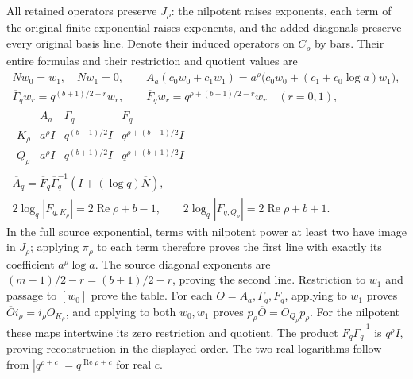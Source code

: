 All retained operators preserve \(J_\rho\): the nilpotent raises
exponents, each term of the original finite exponential raises
exponents, and the added diagonals preserve every original basis
line. Denote their induced operators on \(C_\rho\) by bars.
Their entire formulas and their restriction and quotient values are
\[
 \begin{gathered}
 \overline Nw_0=w_1,\quad\overline Nw_1=0,\qquad
 \overline A_a(c_0w_0+c_1w_1)
   =a^\rho\bigl(c_0w_0+(c_1+c_0\log a)w_1\bigr),\\
 \overline\Gamma_qw_r=q^{(b+1)/2-r}w_r,\qquad
 \overline F_qw_r=q^{\rho+(b+1)/2-r}w_r\quad(r=0,1),\\
 \begin{array}{c|ccc}
 &A_a&\Gamma_q&F_q\\ \hline
 K_\rho&a^\rho I&q^{(b-1)/2}I&q^{\rho+(b-1)/2}I\\
 Q_\rho&a^\rho I&q^{(b+1)/2}I&q^{\rho+(b+1)/2}I
 \end{array}\\
 \overline A_q=\overline F_q\overline\Gamma_q^{-1}
                           (I+(\log q)\overline N),\\
 2\log_q|F_{q,K_\rho}|=2\operatorname{Re}\rho+b-1,\qquad
 2\log_q|F_{q,Q_\rho}|=2\operatorname{Re}\rho+b+1.
 \end{gathered}
 \tag{MRE36}
\]
In the full source exponential, terms with nilpotent power at least
two have image in \(J_\rho\); applying \(\pi_\rho\) to each term
therefore proves the first line with exactly its coefficient
\(a^\rho\log a\). The source diagonal exponents are
\((m-1)/2-r=(b+1)/2-r\), proving the second line.
Restriction to \(w_1\) and passage to \([w_0]\) prove the table.
For each \(O=A_a,\Gamma_q,F_q\), applying to \(w_1\) proves
\(\overline O i_\rho=i_\rho O_{K_\rho}\), and applying to both
\(w_0,w_1\) proves \(p_\rho\overline O=O_{Q_\rho}p_\rho\).
For the nilpotent these maps intertwine its zero restriction
and quotient. The product \(\overline F_q\overline\Gamma_q^{-1}\)
is \(q^\rho I\), proving reconstruction in the displayed order.
The two real logarithms follow from
\(|q^{\rho+c}|=q^{\operatorname{Re}\rho+c}\) for real \(c\).


